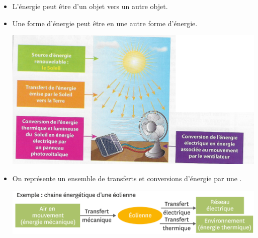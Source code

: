 \begin{mybilan}
	\begin{itemize}
		\item L'énergie peut être  d'un objet vers un autre objet.
		
		\item Une forme d'énergie peut être  en une autre forme d'énergie.
		
		
		\begin{center}
			\includegraphics[scale=0.8]{img/conversion}
		\end{center}
		
		\item On représente un ensemble de transferts et conversions d'énergie par une .

		\begin{center}
			\includegraphics[scale=0.5]{./img/chaine}
		\end{center}
	\end{itemize}
\end{mybilan}


